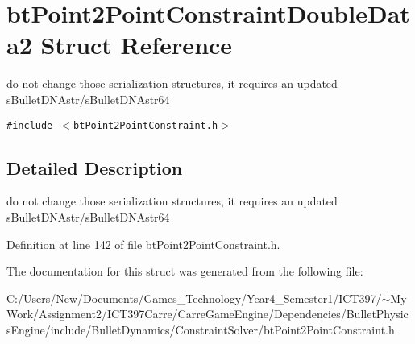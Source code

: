 \hypertarget{structbt_point2_point_constraint_double_data2}{
\section{btPoint2PointConstraintDoubleData2 Struct Reference}
\label{structbt_point2_point_constraint_double_data2}
}
do not change those serialization structures, it requires an updated sBulletDNAstr/sBulletDNAstr64  


{\tt \#include $<$btPoint2PointConstraint.h$>$}



\subsection{Detailed Description}
do not change those serialization structures, it requires an updated sBulletDNAstr/sBulletDNAstr64 

Definition at line 142 of file btPoint2PointConstraint.h.

The documentation for this struct was generated from the following file:\begin{CompactItemize}
\item 
C:/Users/New/Documents/Games\_\-Technology/Year4\_\-Semester1/ICT397/$\sim$My Work/Assignment2/ICT397Carre/CarreGameEngine/Dependencies/BulletPhysicsEngine/include/BulletDynamics/ConstraintSolver/btPoint2PointConstraint.h\end{CompactItemize}
